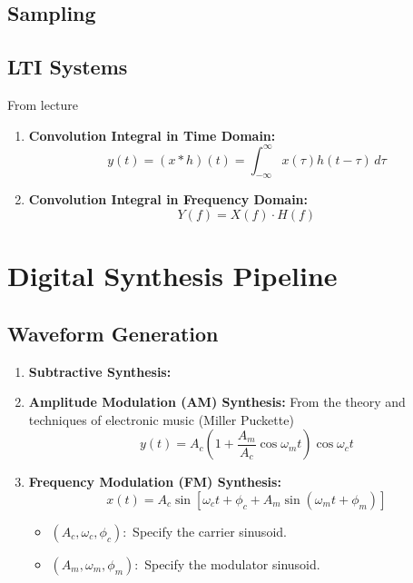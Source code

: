 \documentclass[12pt]{article}
\begin{document}
\subsection{Sampling}

\subsection{LTI Systems}
From lecture
\begin{enumerate}
    \item \textbf{Convolution Integral in Time Domain:}
    \begin{equation}
        y(t) = (x * h)(t) = \int_{-\infty}^{\infty} x(\tau) h(t - \tau) \, d\tau 
    \end{equation}
    \item \textbf{Convolution Integral in Frequency Domain:}
    \begin{equation}
        Y(f) = X(f) \cdot H(f)
    \end{equation}
\end{enumerate}

\section{Digital Synthesis Pipeline}
\subsection{Waveform Generation}
\begin{enumerate}
    \item \textbf{Subtractive Synthesis:}
    \item \textbf{Amplitude Modulation (AM) Synthesis:}
    From the theory and techniques of electronic music (Miller Puckette)
    \begin{equation}
        y(t) = A_c \left( 1 + \frac{A_m}{A_c} \cos \omega_m t \right) \cos \omega_c t
    \end{equation}

    \item \textbf{Frequency Modulation (FM) Synthesis:}
    \begin{equation}
        x(t) = A_c \sin \left[ \omega_c t + \phi_c + A_m \sin(\omega_m t + \phi_m) \right]
    \end{equation}
    
    \begin{itemize}
        \item $(A_c, \omega_c, \phi_c):$ Specify the carrier sinusoid.
        \item $(A_m, \omega_m, \phi_m):$ Specify the modulator sinusoid.
    \end{itemize}
\end{enumerate}
\end{document}
